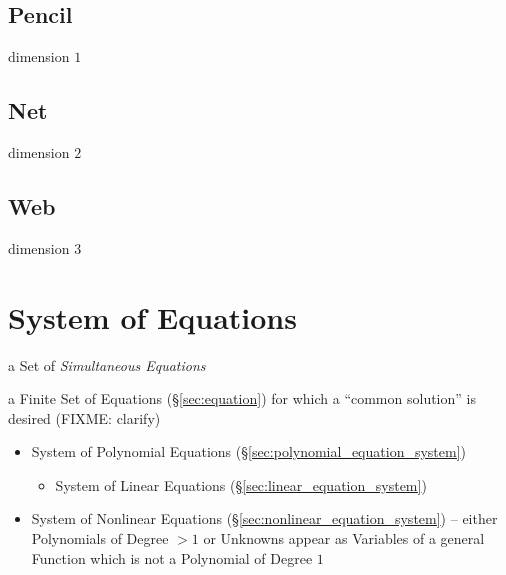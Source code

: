 \subsection{Pencil}\label{sec:pencil}

dimension $1$



\subsection{Net}\label{sec:linear_divisor_net}

dimension $2$




\subsection{Web}\label{sec:web}

dimension $3$



\section{System of Equations}\label{sec:equation_system}

a Set of \emph{Simultaneous Equations}

a Finite Set of Equations (\S\ref{sec:equation}) for which a ``common
solution'' is desired (FIXME: clarify)

\begin{itemize}
  \item System of Polynomial Equations
    (\S\ref{sec:polynomial_equation_system})
  \begin{itemize}
    \item System of Linear Equations (\S\ref{sec:linear_equation_system})
  \end{itemize}
  \item System of Nonlinear Equations
    (\S\ref{sec:nonlinear_equation_system}) -- either Polynomials of Degree
    $>1$ or Unknowns appear as Variables of a general Function which is not a
    Polynomial of Degree $1$
\end{itemize}

